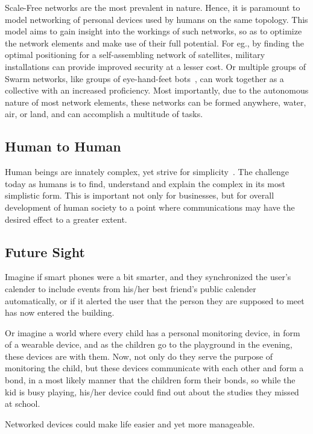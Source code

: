 Scale-Free networks are the most prevalent in nature. Hence, it is paramount to model networking of personal devices used by humans on the same topology. 
This model aims to gain insight into the workings of such networks, so as to optimize the network elements and make use of their full potential. For eg., by finding the optimal positioning for a self-assembling network of satellites, military installations can provide improved security at a lesser cost. Or multiple groups of Swarm networks, like groups of eye-hand-feet bots~\cite{swarm..robots}, can work together as a collective with an increased proficiency.  Most importantly, due to the autonomous nature of most network elements, these networks can be formed anywhere, water, air, or land, and can accomplish a multitude of tasks.

\subsection{Human to Human}
Human beings are innately complex, yet strive for simplicity~\cite{h2h}. The challenge today as humans is to find, understand and explain the complex in its most simplistic form. This is important not only for businesses, but for overall development of human society to a point where communications may have the desired effect to a greater extent.


\subsection{Future Sight}

Imagine if smart phones were a bit smarter, and they synchronized the user's calender to include events from his/her best friend's public calender automatically, or if it alerted the user that the person they are supposed to meet has now entered the building.

Or imagine a world where every child has a personal monitoring device, in form of a wearable device, and as the children go to the playground in the evening, these devices are with them. Now, not only do they serve the purpose of monitoring the child, but these devices communicate with each other and form a bond, in a most likely manner that the children form their bonds, so while the kid is busy playing, his/her device could find out about the studies they missed at school.

Networked devices could make life easier and yet more manageable.



